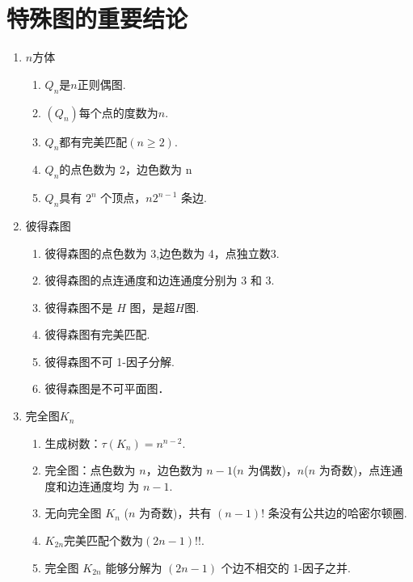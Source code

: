 \section{特殊图的重要结论}
\begin{enumerate}

\item $n$方体
\begin{enumerate}
	\item $Q_n$是$n$正则偶图.
	\item $(Q_n)$每个点的度数为$n$.
	\item $Q_n$都有完美匹配$(n\geq 2)$.
	\item $Q_n$的点色数为 {2}，边色数为 {n}
	\item $Q_n$具有 $2^n$ 个顶点，$n2^{n-1}$ 条边.
\end{enumerate}

\item 彼得森图
\begin{enumerate}
	\item 彼得森图的点色数为 {3},边色数为 {4}，点独立数{3}.
	\item 彼得森图的点连通度和边连通度分别为 3 和 3.
	\item 彼得森图不是 $H$ 图，是超$H$图.
	\item 彼得森图有完美匹配.
	\item 彼得森图不可 1-因子分解.
	\item 彼得森图是不可平面图．
\end{enumerate}

\item 完全图$K_n$
\begin{enumerate}
	\item 生成树数：$\tau(K_n)=n^{n-2}$.
	\item 完全图：点色数为 ${n}$，边色数为 ${n - 1}$($n$ 为偶数)，${n}$($n$ 为奇数)，点连通度和边连通度均
	为 ${n - 1}$.
	\item 无向完全图 $K_n$ ($n$ 为奇数)，共有 $(n - 1)!$ 条没有公共边的哈密尔顿圈.
	\item $K_{2n}$完美匹配个数为$(2n-1)!!$.
	\item 完全图 $K_{2n}$ 能够分解为 $(2n - 1)$ 个边不相交的 1-因子之并.
\end{enumerate}


\end{enumerate}
